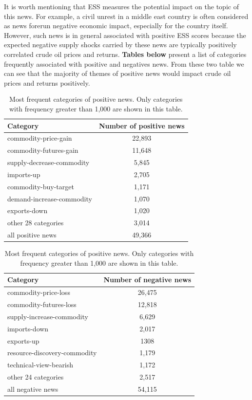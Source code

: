 \documentclass[12pt]{article}
\begin{document}
	\par It is worth mentioning that ESS measures the potential impact on the topic of this news. For example, a civil unrest in a middle east country is often considered as news forerun negative economic impact, especially for the country itself.
	However, such news is in general associated with positive ESS scores because the expected negative supply shocks carried by these news are typically positively correlated crude oil prices and returns. \textbf{Tables below} present a list of categories frequently associated with positive and negatives news. From these two table we can see that the majority of themes of positive news would impact crude oil prices and returns positively.
	\begin{table}[H]
		\centering
		\small
		\begin{tabular}{l|c}
			\toprule
			Category & Number of positive news \\
			\midrule
			commodity-price-gain & 22,893 \\
			commodity-futures-gain & 11,648 \\
			supply-decrease-commodity & 5,845 \\
			imports-up & 2,705 \\
			commodity-buy-target & 1,171 \\
			demand-increase-commodity & 1,070 \\
			exports-down & 1,020 \\
			other 28 categories & 3,014 \\
			\midrule
			all positive news & 49,366 \\
			\bottomrule
		\end{tabular}
		\caption{Most frequent categories of positive news. Only categories with frequency greater than 1,000 are shown in this table.}
	\end{table}

	\begin{table}[H]
		\centering
		\small
		\begin{tabular}{l|c}
			\toprule
			Category & Number of negative news \\
			\midrule
			commodity-price-loss & 26,475 \\
			commodity-futures-loss & 12,818 \\
			supply-increase-commodity & 6,629 \\
			imports-down & 2,017 \\
			exports-up & 1308 \\
			resource-discovery-commodity & 1,179 \\
			technical-view-bearish & 1,172 \\
			other 24 categories & 2,517 \\
			\midrule
			all negative news & 54,115 \\
			\bottomrule
		\end{tabular}
		\caption{Most frequent categories of positive news. Only categories with frequency greater than 1,000 are shown in this table.}
	\end{table}
	
\end{document}
